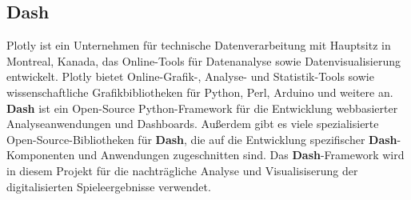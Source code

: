 \subsection{Dash}
Plotly ist ein Unternehmen für technische Datenverarbeitung mit Hauptsitz in Montreal, Kanada, das Online-Tools für Datenanalyse sowie Datenvisualisierung entwickelt. 
Plotly bietet Online-Grafik-, Analyse- und Statistik-Tools sowie wissenschaftliche Grafikbibliotheken für Python, Perl, Arduino und weitere an.
\textbf{Dash} ist ein Open-Source Python-Framework für die Entwicklung webbasierter Analyseanwendungen und Dashboards. 
Außerdem gibt es viele spezialisierte Open-Source-Bibliotheken für \textbf{Dash}, die auf die Entwicklung spezifischer \textbf{Dash}-Komponenten und 
Anwendungen zugeschnitten sind. Das \textbf{Dash}-Framework wird in diesem Projekt für die nachträgliche Analyse und Visualisiserung der digitalisierten
Spieleergebnisse verwendet.
